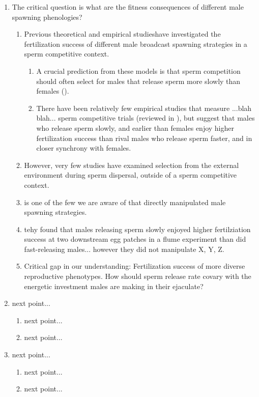 \documentclass{article}
\begin{document}
\begin{enumerate}
	\item The critical question is what are the fitness consequences of different male spawning phenologies?
		\begin{enumerate}
			\item Previous theoretical and empirical studieshave investigated the fertilization success of different male broadcast spawning strategies in a sperm competitive context.
			\begin{enumerate}
				\item A crucial prediction from these models is that sperm competition should often select for males that release sperm more slowly than females (\citealt{BodeMarshall2007, Olito2015, Olito2017}).
				\item There have been relatively few empirical studies that measure ...blah blah... sperm competitive trials (reviewed in \citealt{LotterhosLevitan2011}), but suggest that males who release sperm slowly, and earlier than females enjoy higher fertilization success than rival males who release sperm faster, and in closer synchrony with females.
			\end{enumerate}
			\item However, very few studies have examined selection from the external environment during sperm dispersal, outside of a sperm competitive context.
			\item \citet{BodeMarshall2007} is one of the few we are aware of that directly manipulated male spawning strategies.
			\item tehy found that males releasing sperm slowly enjoyed higher fertilziation success at two downstream egg patches in a flume experiment than did fast-releasing males... however they did not manipulate X, Y, Z.
			\item Critical gap in our understanding: Fertilization success of more diverse reproductive phenotypes. How should sperm release rate covary with the energetic investment males are making in their ejaculate?
		\end{enumerate}
	\item next point...
		\begin{enumerate}
			\item next point...
			\item next point...
		\end{enumerate}

	\item next point...
		\begin{enumerate}
			\item next point...
			\item next point...
		\end{enumerate}

\end{enumerate}
\end{document}

